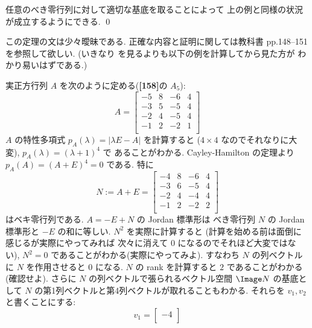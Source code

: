 \documentclass[12pt,twoside]{jarticle}
\begin{document}
\begin{theorem}[べき零行列のJordan標準形]
  任意のべき零行列に対して適切な基底を取ることによって
  上の例と同様の状況が成立するようにできる. \qed
\end{theorem}

この定理の文は少々曖昧である.
正確な内容と証明に関しては教科書 \cite{satake} pp.148--151 を参照して欲しい.
(いきなり \cite{satake} を見るよりも以下の例を計算してから見た方が
わかり易いはずである.)

\begin{example}
  実正方行列 $A$ を次のように定める({\bf[158]}の $A_5$):
  \begin{equation*}
    A =
    \begin{bmatrix}
      -5 &  8 & -6 &  4 \\
      -3 &  5 & -5 &  4 \\
      -2 &  4 & -5 &  4 \\
      -1 &  2 & -2 &  1 \\
    \end{bmatrix}
  \end{equation*}
  $A$ の特性多項式 $p_A(\lambda)=|\lambda E - A|$ を計算すると
  ($4\times 4$ なのでそれなりに大変), $p_A(\lambda)=(\lambda+1)^4$ で
  あることがわかる. Cayley-Hamilton の定理より $p_A(A)=(A+E)^4=0$ である.
  特に 
  \begin{equation*}
    N := A+E =
    \begin{bmatrix}
      -4 & 8 & -6 & 4 \\
      -3 & 6 & -5 & 4 \\
      -2 & 4 & -4 & 4 \\
      -1 & 2 & -2 & 2 \\
    \end{bmatrix}
  \end{equation*}
  はベキ零行列である. $A=-E+N$ の Jordan 標準形は
  べき零行列 $N$ の Jordan 標準形と $-E$ の和に等しい.
  $N^2$ を実際に計算すると
  (計算を始める前は面倒に感じるが実際にやってみれば
  次々に消えて $0$ になるのでそれほど大変ではない),
  $N^2=0$ であることがわかる(実際にやってみよ).
  すなわち $N$ の列ベクトルに $N$ を作用させると $0$ になる.
  $N$ の rank を計算すると $2$ であることがわかる(確認せよ).
  さらに $N$ の列ベクトルで張られるベクトル空間 $\Image N$ の基底と
  して $N$ の第1列ベクトルと第4列ベクトルが取れることもわかる.
  それらを $v_1,v_2$ と書くことにする:
  \begin{equation*}
    v_1 =
    \begin{bmatrix}
      -4 \\

\end{bmatrix}
\end{equation*}
\end{example}
\end{document}
